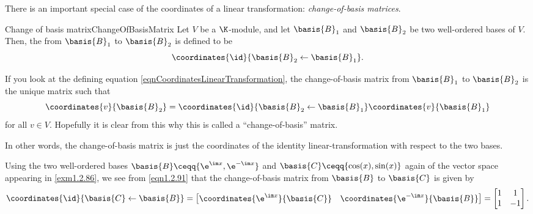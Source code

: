 There is an important special case of the coordinates of a linear transformation:  \emph{change-of-basis matrices}.
\begin{dfn}{Change of basis matrix}{ChangeOfBasisMatrix}
	Let $V$ be a $\K$-module, and let $\basis{B}_1$ and $\basis{B}_2$ be two well-ordered bases of $V$.  Then, the  from $\basis{B}_1$ to $\basis{B}_2$ is defined to be
	\begin{equation}
		\coordinates{\id}{\basis{B}_2\leftarrow \basis{B}_1}.
	\end{equation}
	\begin{rmk}
		If you look at the defining equation \eqref{eqnCoordinatesLinearTransformation}, the change-of-basis matrix from $\basis{B}_1$ to $\basis{B}_2$ is the unique matrix such that
		\begin{equation}
			\coordinates{v}{\basis{B}_2}=\coordinates{\id}{\basis{B}_2\leftarrow \basis{B}_1}\coordinates{v}{\basis{B}_1}
		\end{equation}
		for all $v\in V$.  Hopefully it is clear from this why this is called a ``change-of-basis'' matrix.
	\end{rmk}
	\begin{rmk}
		In other words, the change-of-basis matrix is just the coordinates of the identity linear-transformation with respect to the two bases.
	\end{rmk}
\end{dfn}
\begin{exm}{}{}
	Using the two well-ordered bases $\basis{B}\ceqq \{ \e ^{\im x},\e ^{-\im x}\}$ and $\basis{C}\ceqq \{ \cos (x),\sin (x)\}$ again of the vector space appearing in \cref{exm1.2.86}, we see from \eqref{eqn1.2.91} that the change-of-basis matrix from $\basis{B}$ to $\basis{C}$ is given by
	\begin{equation}
		\coordinates{\id}{\basis{C}\leftarrow \basis{B}}=\begin{bmatrix}\coordinates{\e ^{\im x}}{\basis{C}} & \coordinates{\e ^{-\im x}}{\basis{B}}\end{bmatrix}=\begin{bmatrix}1 & 1 \\ 1 & -1\end{bmatrix}.
	\end{equation}
\end{exm}


